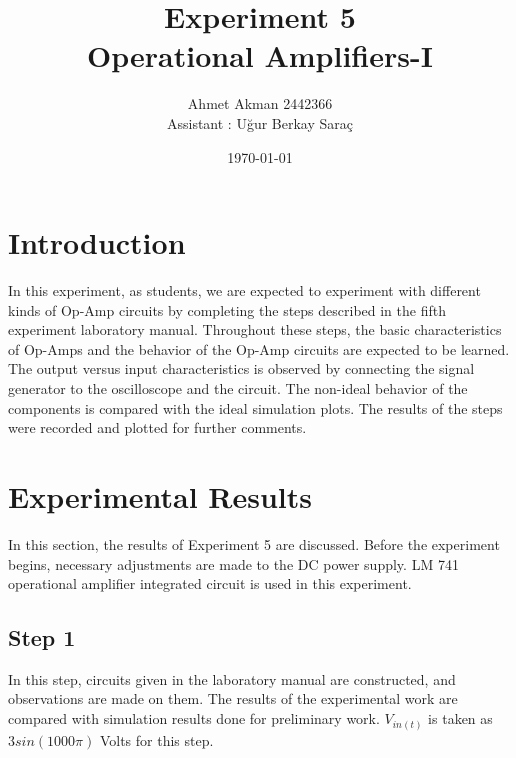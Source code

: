 \documentclass[letterpaper,12pt]{article}
\begin{document}
\title{Experiment 5 \protect\\Operational Amplifiers-I}
\author{Ahmet Akman 2442366 \protect\\ Assistant : Uğur Berkay Saraç}
\date{\today}
\maketitle
\newpage
\tableofcontents
\newpage

\section{Introduction} 
In this experiment, as students, we are expected to experiment with different kinds of Op-Amp circuits by completing the steps described in the fifth experiment laboratory manual. Throughout these steps, the basic characteristics of Op-Amps and the behavior of the Op-Amp circuits are expected to be learned. The output versus input characteristics is observed by connecting the signal generator to the oscilloscope and the circuit. The non-ideal behavior of the components is compared with the ideal simulation plots. The results of the steps were recorded and plotted for further comments.
\section{Experimental Results}
In this section, the results of Experiment 5 are discussed. Before the experiment begins, necessary adjustments are made to the DC power supply. LM 741 operational amplifier integrated circuit is used in this experiment.
\subsection{Step 1}
In this step, circuits given in the laboratory manual are constructed, and observations are made on them. The results of the experimental work are compared with simulation results done for preliminary work.  \(V_{in (t)}\) is taken as \(3sin(1000\pi)\) Volts for this step.
\end{document}
